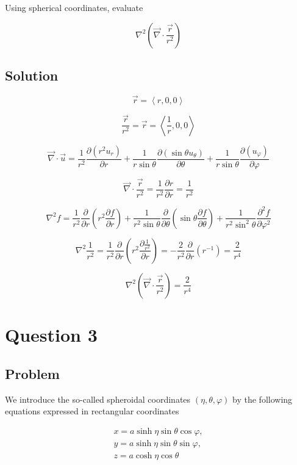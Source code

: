 \documentclass[12pt]{article}
\begin{document}
Using spherical coordinates, evaluate

\[
    \nabla^2\left(\vec{\nabla} \cdot \frac{\vec{r}}{r^2}\right)
\]



\subsection{Solution}

\[
    \vec{r} = \left\langle r, 0, 0 \right\rangle
\]

\[
    \frac{\vec{r}}{r^2} =
    \vec{r} = \left\langle \frac{1}{r}, 0, 0 \right\rangle
\]

\[
    \vec{\nabla} \cdot \vec{u}=
    \frac{1}{r^2} \frac{\partial\left(r^2 u_r\right)}{\partial r}+\frac{1}{r \sin \theta} \frac{\partial\left(\sin \theta u_\theta\right)}{\partial \theta}+\frac{1}{r \sin \theta} \frac{\partial\left(u_{\varphi}\right)}{\partial \varphi}
\]

\[
    \vec{\nabla} \cdot \frac{\vec{r}}{r^2} =
    \frac{1}{r^2} \frac{\partial r}{\partial r} = \frac{1}{r^2}
\]

\[
    \nabla^2 f=\frac{1}{r^2} \frac{\partial}{\partial r}\left(r^2 \frac{\partial f}{\partial r}\right)+\frac{1}{r^2 \sin \theta} \frac{\partial}{\partial \theta}\left(\sin \theta \frac{\partial f}{\partial \theta}\right)+\frac{1}{r^2 \sin ^2 \theta} \frac{\partial^2 f}{\partial \varphi^2}
\]

\[
    \nabla^2 \frac{1}{r^2} =
    \frac{1}{r^2} \frac{\partial}{\partial r}\left(r^2 \frac{\partial \frac{1}{r^2}}{\partial r}\right) =
    - \frac{2}{r^2} \frac{\partial}{\partial r}\left(r^{-1}\right) = \frac{2}{r^4}
\]

\[
    \nabla^2\left(\vec{\nabla} \cdot \frac{\vec{r}}{r^2}\right) = \frac{2}{r^4}
\]

\newpage
\section{Question 3}

\subsection{Problem}

We introduce the so-called spheroidal coordinates \((\eta, \theta, \varphi)\) by the following equations expressed in rectangular coordinates

\[
    \begin{gathered}
        x=a \sinh \eta \sin \theta \cos \varphi, \\
        y=a \sinh \eta \sin \theta \sin \varphi, \\
        z=a \cosh \eta \cos \theta
    \end{gathered}
\]
\end{document}
